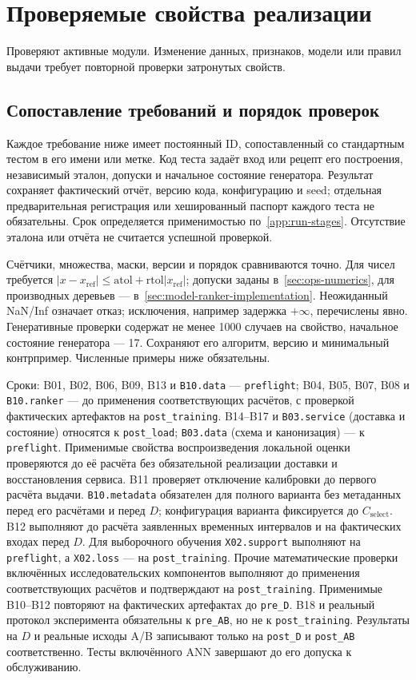 \documentclass[12pt,a4paper]{article}
\newcommand{\code}[1]{{\ttfamily\small\nolinkurl{#1}}}
\theoremstyle{plainru}
\begin{document}
\section{Проверяемые свойства реализации}\label{app:tests}

Проверяют активные модули. Изменение данных, признаков, модели или
правил выдачи требует повторной проверки затронутых свойств.

\subsection{Сопоставление требований и порядок проверок}\label{app:tests-normative}

Каждое требование ниже имеет постоянный ID, сопоставленный со стандартным
тестом в его имени или метке. Код теста задаёт вход или рецепт его
построения, независимый эталон, допуски и начальное состояние генератора.
Результат сохраняет фактический отчёт, версию кода, конфигурацию и seed;
отдельная предварительная регистрация или хешированный паспорт каждого
теста не обязательны. Срок определяется применимостью по~\ref{app:run-stages}.
Отсутствие эталона или отчёта не считается успешной проверкой.

Счётчики, множества, маски, версии и порядок сравниваются точно.
Для чисел требуется
$|x-x_{\mathrm{ref}}|\le\mathrm{atol}+\mathrm{rtol}|x_{\mathrm{ref}}|$;
допуски заданы в~\ref{sec:ops-numerics}, для производных деревьев ---
в~\ref{sec:model-ranker-implementation}. Неожиданный NaN/Inf означает
отказ; исключения, например задержка $+\infty$, перечислены явно.
Генеративные проверки содержат не менее 1000 случаев на свойство,
начальное состояние генератора --- 17. Сохраняют его алгоритм, версию
и минимальный контрпример. Численные примеры ниже обязательны.

Сроки: B01, B02, B06, B09, B13 и \code{B10.data} --- \code{preflight};
B04, B05, B07, B08 и \code{B10.ranker} --- до применения соответствующих
расчётов, с проверкой фактических артефактов на \code{post_training}.
B14--B17 и \code{B03.service} (доставка и состояние) относятся
к \code{post_load}; \code{B03.data} (схема и канонизация) --- к \code{preflight}.
Применимые свойства воспроизведения локальной оценки проверяются
до её расчёта без обязательной реализации доставки и восстановления сервиса.
B11 проверяет отключение калибровки до первого расчёта выдачи.
\code{B10.metadata} обязателен для полного варианта
без метаданных перед его расчётами и перед $D$; конфигурация варианта
фиксируется до $C_{\mathrm{select}}$.
B12 выполняют до расчёта заявленных временных интервалов
и на фактических входах перед $D$.
Для выборочного обучения \code{X02.support} выполняют на
\code{preflight}, а \code{X02.loss} --- на \code{post_training}.
Прочие математические проверки включённых исследовательских компонентов
выполняют до применения соответствующих расчётов и подтверждают
на \code{post_training}. Применимые B10--B12 повторяют на фактических
артефактах до \code{pre_D}. B18 и реальный протокол эксперимента
обязательны к \code{pre_AB}, но не к \code{post_training}.
Результаты на $D$ и реальные исходы A/B
записывают только на \code{post_D} и \code{post_AB} соответственно.
Тесты включённого ANN завершают до его допуска к обслуживанию.
\end{document}

